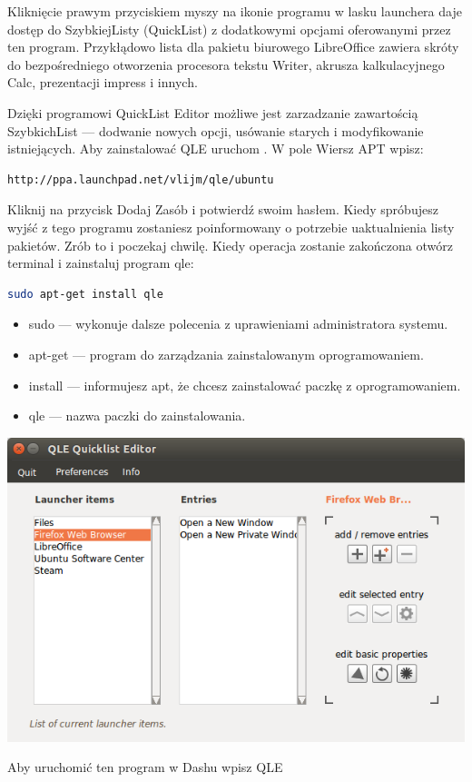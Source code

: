 Kliknięcie prawym przyciskiem myszy na ikonie programu w lasku launchera daje dostęp do SzybkiejListy (QuickList) z dodatkowymi opcjami oferowanymi przez ten program. Przykłądowo lista dla pakietu biurowego LibreOffice zawiera skróty do bezpośredniego otworzenia procesora tekstu Writer, akrusza kalkulacyjnego Calc, prezentacji impress i innych.

Dzięki programowi QuickList Editor możliwe jest zarzadzanie zawartością SzybkichList --- dodwanie nowych opcji, usówanie starych i modyfikowanie istniejących. Aby zainstalować QLE uruchom . W pole \textcolor{ubuntu_orange}{Wiersz APT} wpisz:
\begin{lstlisting}
http://ppa.launchpad.net/vlijm/qle/ubuntu
\end{lstlisting}
Kliknij na przycisk \textcolor{ubuntu_orange}{Dodaj Zasób} i potwierdź swoim hasłem. Kiedy spróbujesz wyjść z tego programu zostaniesz poinformowany o potrzebie uaktualnienia listy pakietów. Zrób to i poczekaj chwilę. Kiedy operacja zostanie zakończona otwórz terminal i zainstaluj program qle:
\begin{lstlisting}[language=bash]
sudo apt-get install qle
\end{lstlisting}
\begin{itemize}
\item \textcolor{ubuntu_orange}{sudo} --- wykonuje dalsze polecenia z uprawieniami administratora systemu.
\item \textcolor{ubuntu_orange}{apt-get} --- program do zarządzania zainstalowanym oprogramowaniem.
\item \textcolor{ubuntu_orange}{install} --- informujesz apt, że chcesz zainstalować paczkę z oprogramowaniem.
\item \textcolor{ubuntu_orange}{qle} --- nazwa paczki do zainstalowania.
\end{itemize}
\begin{center}
	\includegraphics[width=\linewidth]{images/programy_qle.png}
\end{center}

Aby uruchomić ten program w Dashu wpisz \textcolor{ubuntu_orange}{QLE}